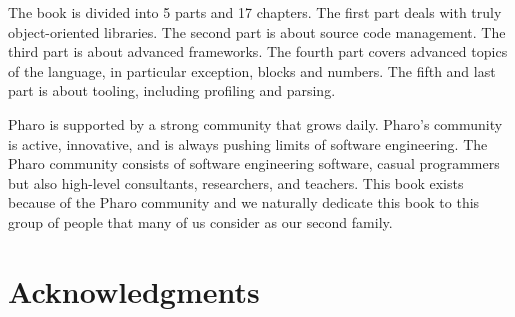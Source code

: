\documentclass[a4paper,10pt,twoside]{book}
\begin{document}
The book is divided into 5 parts and 17 chapters. The first part deals with truly object-oriented libraries. The second part is about source code management. The third part is about advanced frameworks. The fourth part covers advanced topics of the language, in particular exception, blocks and numbers. The fifth and last part is about tooling, including profiling and parsing.


Pharo is supported by a strong community that grows daily. Pharo's community is active, innovative, and is always pushing limits of software engineering. The Pharo community consists of software engineering software, casual programmers but also high-level consultants, researchers, and teachers.
This book exists because of the Pharo community and we naturally dedicate this book to this group of people that many of us consider as our second family.


\section*{Acknowledgments}
\end{document}

